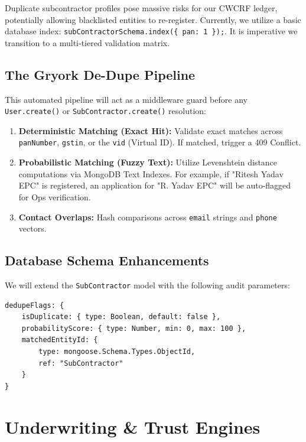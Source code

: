 \documentclass[11pt, a4paper]{report}
\begin{document}
Duplicate subcontractor profiles pose massive risks for our CWCRF ledger, potentially allowing blacklisted entities to re-register. Currently, we utilize a basic database index: \texttt{subContractorSchema.index(\{ pan: 1 \});}. It is imperative we transition to a multi-tiered validation matrix.

\section{The Gryork De-Dupe Pipeline}
This automated pipeline will act as a middleware guard before any \texttt{User.create()} or \texttt{SubContractor.create()} resolution:

\begin{enumerate}[label=\textbf{\textcolor{gryorkBlue}{Step \arabic*.}}, itemsep=0.3em]
    \item \textbf{Deterministic Matching (Exact Hit):} Validate exact matches across \texttt{panNumber}, \texttt{gstin}, or the \texttt{vid} (Virtual ID). If matched, trigger a 409 Conflict.
    \item \textbf{Probabilistic Matching (Fuzzy Text):} Utilize Levenshtein distance computations via MongoDB Text Indexes. For example, if "Ritesh Yadav EPC" is registered, an application for "R. Yadav EPC" will be auto-flagged for Ops verification.
    \item \textbf{Contact Overlaps:} Hash comparisons across \texttt{email} strings and \texttt{phone} vectors.
\end{enumerate}

\section{Database Schema Enhancements}
We will extend the \texttt{SubContractor} model with the following audit parameters:
\begin{verbatim}
dedupeFlags: {
    isDuplicate: { type: Boolean, default: false },
    probabilityScore: { type: Number, min: 0, max: 100 },
    matchedEntityId: { 
        type: mongoose.Schema.Types.ObjectId, 
        ref: "SubContractor" 
    }
}
\end{verbatim}

\chapter{Underwriting \& Trust Engines}
\end{document}
